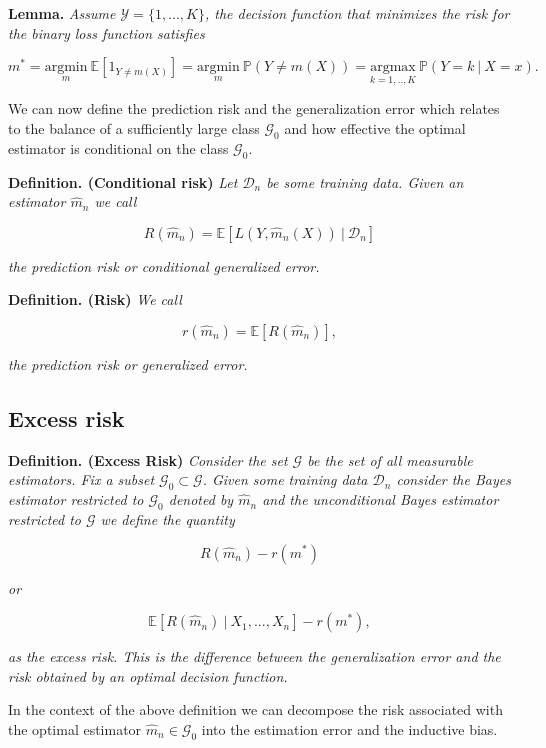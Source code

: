 \documentclass[a4paper,10pt,openany]{book}
\begin{document}
\textbf{Lemma.} \emph{Assume \(\mathcal{Y}=\{1,...,K\}\), the decision function that minimizes the risk for the binary loss function satisfies}

\[
m^*=\underset{m}{\text{argmin}}\ \mathbb{E}[1_{Y\ne m(X)}]=\underset{m}{\text{argmin}}\  \mathbb{P}(Y\ne m(X))=\underset{k=1,..,K}{\text{argmax}}\ \mathbb{P}(Y=k\ \vert\ X=x).
\]

We can now define the prediction risk and the generalization error which relates to the balance of a sufficiently large class \(\mathcal{G}_0\) and how effective the optimal estimator is conditional on the class \(\mathcal{G}_0\).

\textbf{Definition. (Conditional risk)} \emph{Let \(\mathcal{D}_n\) be some training data. Given an estimator \(\hat{m}_n\) we call}

\[
R(\hat{m}_n)=\mathbb{E}[L(Y,\hat{m}_n(X))\ \vert\ \mathcal{D}_n]
\]

\emph{the prediction risk or conditional generalized error.}

\textbf{Definition. (Risk)} \emph{We call}

\[
r(\hat{m}_n)=\mathbb{E}[R(\hat{m}_n)],
\]

\emph{the prediction risk or generalized error.}

\hypertarget{excess-risk}{%
\subsection{Excess risk}\label{excess-risk}}

\textbf{Definition. (Excess Risk)} \emph{Consider the set \(\mathcal{G}\) be the set of all measurable estimators. Fix a subset \(\mathcal{G}_0\subset\mathcal{G}\). Given some training data \(\mathcal{D}_n\) consider the Bayes estimator restricted to \(\mathcal{G}_0\) denoted by \(\hat{m}_n\) and the unconditional Bayes estimator restricted to \(\mathcal{G}\) we define the quantity}

\[
R(\hat{m}_n)-r(m^*)
\]

\emph{or}

\[
\mathbb{E}[R(\hat{m}_n)\ \vert\ X_1,...,X_n]-r(m^*),
\]

\emph{as the excess risk. This is the difference between the generalization error and the risk obtained by an optimal decision function.}

In the context of the above definition we can decompose the risk associated with the optimal estimator \(\hat{m}_n\in\mathcal{G}_0\) into the estimation error and the inductive bias.
\end{document}
